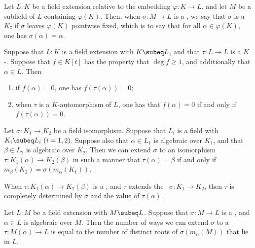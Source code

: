 \documentclass{article}
\begin{document}
  \begin{tdefinition}[\( F \)-\homo]
    Let \(L : K\) be a field extension relative to the embedding \(\varphi : K \to L\), and let \(M\) be a subfield of \(L\) containing \(\varphi(K)\).
    Then, when \(\sigma : M \to L\) is a \homo , we say that \(\sigma\) is a \ul{\(K\)-\homo} if \(\sigma\) leaves \(\varphi(K)\) pointwise fixed, which is to say that for all \(\alpha \in \varphi(K)\), one has \( \sigma(\alpha) = \alpha \).
  \end{tdefinition}

  \begin{tproposition}
    Suppose that \( L:K \) is a field extension with \( K\subeq L \), and that \( \tau:L\to L \) is a \( K \)-\homo .
    Suppose that \( f\in K[t] \) has the property that \( \deg f \geq 1 \), and additionally that \( \alpha\in L \).
    Then \begin{enumerate}[label=(\roman*)]
      \item if \( f(\alpha) = 0 \), one has \( f(\tau(\alpha)) = 0 \);
      \item when \( \tau \) is a \( K \)-automorphism of \( L \), one has that \( f(\alpha) = 0 \) if and only if \( f(\tau(\alpha)) = 0 \).
    \end{enumerate}
  \end{tproposition}

  \begin{ttheorem}
    Let \( \sigma :K_1\to K_2 \) be a field isomorphism.
    Suppose that \( L_i \) is a field with \( K_i\subeq L_i\ (i=1,2) \).
    Suppose also that \( \alpha\in L_1 \) is algebraic over \( K_1 \), and that \( \beta\in L_2 \) is algebraic over \( K_2 \).
    Then we can extend \( \sigma \) to an isomorphism \( \tau:K_1(\alpha)\to K_2(\beta) \) in such a manner that \( \tau(\alpha) = \beta \) if and only if \( m_\beta(K_2) = \sigma(m_\alpha(K_1)) \).
  \end{ttheorem}

  \quad When \( \tau:K_1(\alpha)\to K_2(\beta) \) is a \homo, and \( \tau \) extends the \homo~\( \sigma:K_1\to K_2 \), then \( \tau \) is completely determined by \( \sigma \) and the value of \( \tau(\alpha) \).

  \begin{tcorollary}
    Let \( L:M \) be a field extension with \( M\subeq L \).
    Suppose that \( \sigma:M\to L \) is a \homo, and \( \alpha\in L \) is algebraic over \( M \).
    Then the number of ways we can extend \( \sigma \) to a \homo~\( \tau:M(\alpha)\to L \) is equal to the number of distinct roots of \( \sigma(m_\alpha(M)) \) that lie in \( L \).
  \end{tcorollary}
\end{document}
